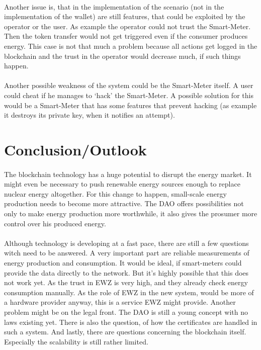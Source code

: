 \documentclass{scrartcl}
\begin{document}
	\paragraph{}
	Another issue is, that in the implementation of the scenario (not in the implementation of the wallet) are still features, that could be exploited by the operator or the user. As example the operator could not trust the Smart-Meter. Then the token transfer would not get triggered even if the consumer produces energy. This case is not that much a problem because all actions get logged in the blockchain and the trust in the operator would decrease much, if such things happen. 
	
	\paragraph{}
	Another possible weakness of the system could be the Smart-Meter itself. A user could cheat if he manages to ‘hack’ the Smart-Meter. A possible solution for this would be a Smart-Meter that has some features that prevent hacking (as example it destroys its private key, when it notifies an attempt).
	
\section{Conclusion/Outlook}
    
    \paragraph{}
    The blockchain technology has a huge potential to disrupt the energy market. It might even be necessary to push renewable energy sources enough to replace nuclear energy altogether. For this change to happen, small-scale energy production needs to become more attractive. The DAO offers possibilities not only to make energy production more worthwhile, it also gives the prosumer more control over his produced energy.
    
	\paragraph{}
	Although technology is developing at a fast pace, there are still a few questions witch need to be answered. A very important part are reliable measurements of energy production and consumption. It would be ideal, if smart-meters could provide the data directly to the network. But it's highly possible that this does not work yet. As the trust in EWZ is very high, and they already check energy consumption manually. As the role of EWZ in the new system, would be more of a hardware provider anyway, this is a service EWZ might provide. Another problem might be on the legal front. The DAO is still a young concept with no laws existing yet. There is also the question, of how the certificates are handled in such a system. And lastly, there are questions concerning the blockchain itself. Especially the scalability is still rather limited.
	
\end{document}
